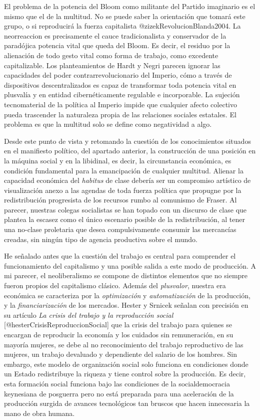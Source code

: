 El problema de la potencia del Bloom como militante del Partido imaginario es el mismo que el de la multitud. No se puede saber la orientación que tomará este grupo, o si reproducirá la fuerza capitalista @zizekRevolucionBlanda2004. La neorreaccion es precisamente el cauce tradicionalista y conservador de la paradójica potencia vital que queda del Bloom. Es decir, el residuo por la alienación de todo gesto vital como forma de trabajo, como excedente capitalizable. Los planteamientos de Hardt y Negri parecen ignorar las capacidades del poder contrarrevolucionario del Imperio, cómo a través de dispositivos descentralizados es capaz de transformar toda potencia vital en plusvalía y en entidad cibernéticamente regulable e incorporable. La sujeción tecnomaterial de la política al Imperio impide que cualquier afecto colectivo pueda trascender la naturaleza propia de las relaciones sociales estatales. El problema es que la multitud solo se define como negatividad a algo.

Desde este punto de vista y retomando la cuestión de los conocimientos situados en el manifiesto político, del apartado anterior, la construcción de una posición en la máquina social y en la libidinal, es decir, la circunstancia económica, es condición fundamental para la emancipación de cualquier multitud. Alienar la capacidad económica del \emph{habitus} de clase debería ser un compromiso artístico de visualización anexo a las agendas de toda fuerza política que propugne por la redistribución progresista de los recursos rumbo al comunismo de Fraser. Al parecer, nuestras colegas socialistas se han topado con un discurso de clase que plantea la escasez como el único escenario posible de la redistribución, al tener una no-clase proletaria que desea compulsivamente consumir las mercancías creadas, sin ningún tipo de agencia productiva sobre el mundo.

He señalado antes que la cuestión del trabajo es central para comprender el funcionamiento del capitalismo y una posible salida a este modo de producción. A mi parecer, el neoliberalismo se compone de distintos elementos que no siempre fueron propios del capitalismo clásico. Además del \emph{plusvalor}, nuestra era económica se caracteriza por la \emph{optimización} y \emph{automatización} de la producción, y la \emph{financiarización} de los mercados. Hester y Srnicek señalan con precisión en su artículo \emph{La crisis del trabajo y la reproducción social} [@hesterCrisisReproduccionSocial] que la crisis del trabajo para quienes se encargan de reproducir la economía y los cuidados sin remuneración, en su mayoría mujeres, se debe al no reconocimiento del trabajo reproductivo de las mujeres, un trabajo devaluado y dependiente del salario de los hombres. Sin embargo, este modelo de organización social solo funciona en condiciones donde un Estado redistribuye la riqueza y tiene control sobre la producción. Es decir, esta formación social funciona bajo las condiciones de la socialdemocracia keynesiana de posguerra pero no está preparada para una aceleración de la producción surgida de avances tecnológicos tan bruscos que hacen innecesaria la mano de obra humana.

